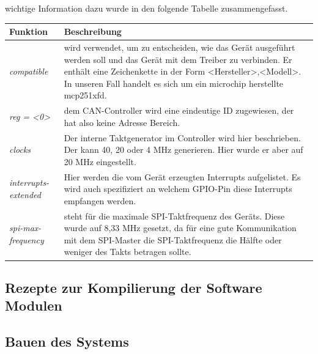 wichtige Information dazu wurde in den folgende Tabelle zusammengefasst. 

\begin{tabular}{lp{11cm}}
	\toprule
	\textbf{Funktion} &\textbf{Beschreibung}\\
	\midrule
	\textit{compatible} & wird verwendet, um zu entscheiden, wie das Gerät ausgeführt werden soll und das Gerät mit dem Treiber zu verbinden. Er enthält eine Zeichenkette in der Form <Hersteller>,<Modell>. In unseren Fall handelt es sich um ein microchip herstellte mcp251xfd.\\
	\textit{reg = <0>} & dem CAN-Controller wird eine eindeutige ID zugewiesen, der hat  also keine Adresse Bereich. \\
	\textit{clocks} & Der interne Taktgenerator im Controller wird hier beschrieben. Der kann 40, 20 oder 4 MHz generieren. Hier wurde er aber auf 20 MHz eingestellt.\\
	\textit{interrupts-extended} & Hier werden die vom Gerät erzeugten Interrupts aufgelistet. Es wird auch spezifiziert an welchem GPIO-Pin diese Interrupts empfangen werden.\\
	\textit{spi-max-frequency} & steht für die maximale SPI-Taktfrequenz des Geräts. Diese wurde auf 8,33 MHz gesetzt, da für eine gute Kommunikation mit dem SPI-Master die SPI-Taktfrequenz die Hälfte oder weniger des Takts betragen sollte. \\
	\bottomrule
\end{tabular}
\subsection{Rezepte zur Kompilierung der Software Modulen}
\subsection{Bauen des Systems}

